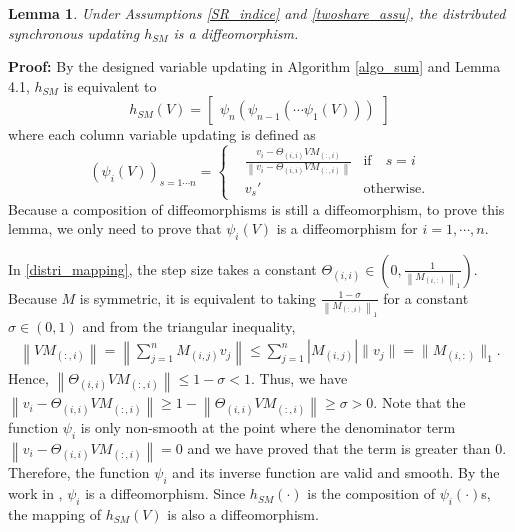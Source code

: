 \documentclass[journal]{IEEEtran}
\newtheorem{lemma}{Lemma}[section]
\newcommand{\upcite}[1]{\textsuperscript{\textsuperscript{\cite{#1}}}}
\begin{document}
\begin{lemma}\label{diffeo_lemma}
	Under Assumptions \ref{SR_indice} and \ref{twoshare_assu}, the distributed synchronous updating $h_{SM}$ is a diffeomorphism.
\end{lemma}
\par\textbf{Proof:}
By the designed variable updating in Algorithm \ref{algo_sum} and Lemma 4.1, $h_{SM}$ is equivalent to
$$h_{SM}(V)=\left[\begin{matrix}\psi_n(\psi_{n-1}(\cdots\psi_1(V)))\end{matrix}\right]$$
where each column variable updating is defined as
$$ (\psi_i({V}))_{s=1\cdots n} =\left\{
\begin{array}{rcl}
&\frac{v_i-\Theta_{(i,i)} V M_{(:,i)} }{\left\|v_i-\Theta_{(i,i)}  V M_{(:,i)}\right\|} & \text{if} \quad s=i\\
&v_s' & \text{otherwise.}
\end{array} \right.$$
Because a composition of diffeomorphisms is still a diffeomorphism\upcite{inci2012regularity}, to prove this lemma, we only need to prove
 that $\psi_i(V)$ is a diffeomorphism for $i=1,\cdots,n$.
\par In \eqref{distri_mapping}, the step size takes a constant $\Theta_{(i,i)}\in(0,\frac{1}{\left\|M_{(i,:)}\right\|_1})$. Because $M$ is symmetric, it is equivalent to taking $\frac{1-\sigma}{\left\|M_{(:,i)}\right\|_1}$ for a constant $\sigma \in (0,1)$ and from the triangular inequality,
\begin{align*}
\left\| V M_{(:,i)}\right\|=\left\|\sum_{j=1}^n M_{(i,j)} v_j\right\|\leq \sum_{j=1}^n \left|M_{(i,j)}\right|\|v_j\|=\|M_{(i,:)}\|_1.
\end{align*}
Hence, $\left\|\Theta_{(i,i)} V M_{(:,i)}\right\|\leq 1-\sigma<1$. Thus, we have $\left\|v_i-\Theta_{(i,i)} V M_{(:,i)} \right\|\geq 1- \left\|\Theta_{(i,i)}  V M_{(:,i)}\right\|\geq \sigma>0$. Note that the function $\psi_i$ is only non-smooth at the point where the denominator term $\left\|v_i-\Theta_{(i,i)} V M_{(:,i)} \right\|=0$ and we have proved that the term is greater than $0$. Therefore, the function $\psi_i$ and its inverse function are valid and smooth. By the work in  \cite[Lemma C.2]{wang2017mixing}, $\psi_i$ is a diffeomorphism.  Since $h_{SM}(\cdot)$ is the composition of $\psi_i(\cdot)$s, the mapping of $h_{SM}(V)$ is also a diffeomorphism.
\end{document}
